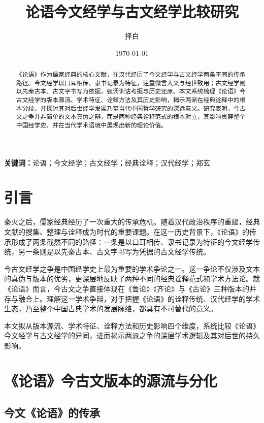 \documentclass[12pt,a4paper]{article}
\title{\heiti 论语今文经学与古文经学比较研究}
\author{择白}
\date{\today}
\begin{document}
\maketitle

\begin{abstract}
《论语》作为儒家经典的核心文献，在汉代经历了今文经学与古文经学两条不同的传承路径。今文经学以口耳相传、隶书记录为特征，注重微言大义与经世致用；古文经学则以先秦古本、古文字书写为依据，强调训诂考据与历史还原。本文系统梳理《论语》今古文经学的版本源流、学术特征、诠释方法及其历史影响，揭示两派在经典诠释中的根本分歧，并探讨其对后世经学发展乃至当代中国哲学研究的深远意义。研究表明，今古文之争并非简单的文本真伪之辩，而是两种经典诠释范式的根本对立，其影响贯穿整个中国经学史，并在当代学术语境中展现出新的理论价值。
\end{abstract}

\textbf{关键词：}论语；今文经学；古文经学；经典诠释；汉代经学；郑玄

\tableofcontents
\newpage

\section{引言}

秦火之后，儒家经典经历了一次重大的传承危机。随着汉代政治秩序的重建，经典文献的搜集、整理与诠释成为时代的重要课题。在这一历史背景下，《论语》的传承形成了两条截然不同的路径：一条是以口耳相传、隶书记录为特征的今文经学传统，另一条则是以先秦古本、古文字书写为凭据的古文经学传统。

今古文经学之争是中国经学史上最为重要的学术争论之一。这一争论不仅涉及文本的真伪与版本的优劣，更深层地反映了两种不同的经典诠释范式和学术方法论。就《论语》而言，今古文之争直接体现在《鲁论》《齐论》与《古论》三种版本的并存与融合上。理解这一学术争辩，对于把握《论语》的诠释传统、汉代经学的学术生态，乃至整个中国古典学术的发展脉络，都具有不可替代的意义。

本文拟从版本源流、学术特征、诠释方法和历史影响四个维度，系统比较《论语》今文经学与古文经学的异同，进而揭示两派之争的深层学术逻辑及其对后世的持久影响。

\section{《论语》今古文版本的源流与分化}

\subsection{今文《论语》的传承}
\end{document}
